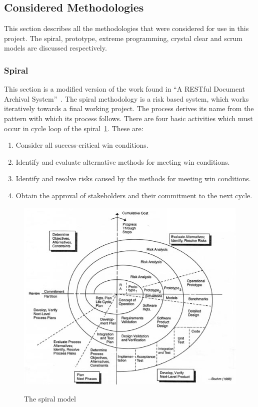 \documentclass[11pt,a4paper]{article}
\begin{document}
\subsection{Considered Methodologies}
\label{sec:considered-methods}

This section describes all the methodologies that were considered for use in this project. The spiral, prototype, extreme programming, crystal clear and scrum models are discussed respectively.

\subsubsection{Spiral}
This section is a modified version of the work found in ``A RESTful Document Archival System''~\cite{restWeb}. The spiral methodology is a risk based system, which works iteratively towards a final working project. The process derives its name from the pattern with which its process follows. There are four basic activities which must occur in cycle loop of the spiral~\ref{fig:spiral}. These are:

\begin{enumerate}
  \item Consider all success-critical win conditions.
  \item Identify and evaluate alternative methods for meeting win conditions.
  \item Identify and resolve risks caused by the methods for meeting win conditions. 
  \item Obtain the approval of stakeholders and their commitment to the next cycle. 
\end{enumerate}

\begin{figure}[H]
\begin{center}
\includegraphics[scale=2.5]{spiral.jpeg}
\label{fig:spiral}
\caption{The spiral model \cite{spiral}}
\end{center}
\end{figure}
\end{document}
